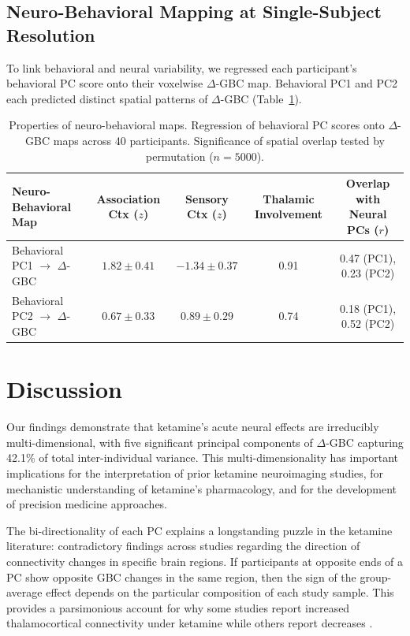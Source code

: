 \documentclass[11pt]{article}
\begin{document}
\subsection{Neuro-Behavioral Mapping at Single-Subject Resolution}

To link behavioral and neural variability, we regressed each participant's behavioral PC score onto their voxelwise $\Delta$-GBC map. Behavioral PC1 and PC2 each predicted distinct spatial patterns of $\Delta$-GBC (Table~\ref{tab:neurobehavioral}).

\begin{table}[H]
\centering
\caption{Properties of neuro-behavioral maps. Regression of behavioral PC scores onto $\Delta$-GBC maps across 40 participants. Significance of spatial overlap tested by permutation ($n = 5000$).}
\label{tab:neurobehavioral}
\begin{tabular}{lcccc}
\toprule
\textbf{Neuro-Behavioral Map} & \textbf{Association Ctx ($z$)} & \textbf{Sensory Ctx ($z$)} & \textbf{Thalamic Involvement} & \textbf{Overlap with Neural PCs ($r$)} \\
\midrule
Behavioral PC1 $\rightarrow$ $\Delta$-GBC & $1.82 \pm 0.41$ & $-1.34 \pm 0.37$ & 0.91 & 0.47 (PC1), 0.23 (PC2) \\
Behavioral PC2 $\rightarrow$ $\Delta$-GBC & $0.67 \pm 0.33$ & $0.89 \pm 0.29$ & 0.74 & 0.18 (PC1), 0.52 (PC2) \\
\bottomrule
\end{tabular}
\end{table}

\section{Discussion}

Our findings demonstrate that ketamine's acute neural effects are irreducibly multi-dimensional, with five significant principal components of $\Delta$-GBC capturing 42.1\% of total inter-individual variance. This multi-dimensionality has important implications for the interpretation of prior ketamine neuroimaging studies, for mechanistic understanding of ketamine's pharmacology, and for the development of precision medicine approaches.

The bi-directionality of each PC explains a longstanding puzzle in the ketamine literature: contradictory findings across studies regarding the direction of connectivity changes in specific brain regions. If participants at opposite ends of a PC show opposite GBC changes in the same region, then the sign of the group-average effect depends on the particular composition of each study sample. This provides a parsimonious account for why some studies report increased thalamocortical connectivity under ketamine while others report decreases \citep{driesen2013, anticevic2015}.
\end{document}

